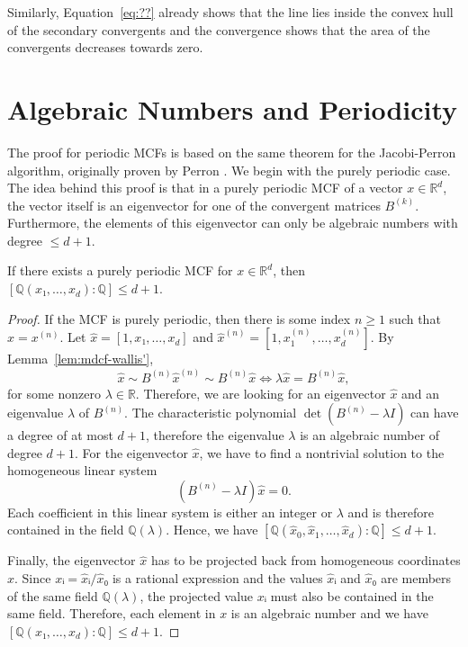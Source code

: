Similarly,
Equation~\ref{eq:??} already shows that the line lies inside the convex hull of
the secondary convergents
and the convergence shows that the area of the convergents decreases towards zero.
\fi

\section{Algebraic Numbers and Periodicity}
\label{sec:mcf-periodic}

The proof for periodic MCFs is based on the same theorem for the Jacobi-Perron
algorithm, originally proven by Perron \cite{Perron07}.
We begin with the purely periodic case.
The idea behind this proof is that in a purely periodic MCF of a vector $x ∈ ℝ^d$,
the vector itself is an eigenvector for one of the convergent matrices $B^{(k)}$.
Furthermore, the elements of this eigenvector can only be algebraic numbers with degree $≤ d+1$.

\begin{lemma}
  \label{lem:mdcf-purely-periodic}
  If there exists a purely periodic MCF for $x ∈ ℝ^d$,
  then $[ℚ(x₁, …, x_d) : ℚ] ≤ d+1$.
\end{lemma}

\begin{proof}
  If the MCF is purely periodic, then there is some index $n ≥ 1$ such that $x = x^{(n)}$.
  Let $\hat x = [1, x₁, …, x_d]$ and $\hat x^{(n)} = [1, x_1^{(n)}, …, x_d^{(n)}]$.
  By Lemma~\ref{lem:mdcf-wallis'},
  \[
    \hat x \sim B^{(n)} \hat x^{(n)} \sim B^{(n)} \hat x \iff λ \hat x = B^{(n)} \hat x,
  \]
  for some nonzero $λ ∈ ℝ$.
  Therefore, we are looking for an eigenvector $\hat x$ and an eigenvalue $λ$ of $B^{(n)}$.
  The characteristic polynomial $\det(B^{(n)} - λ I)$ can have a degree of at most $d+1$,
  therefore the eigenvalue $λ$ is an algebraic number of degree $d+1$.
  For the eigenvector $\hat x$, we have to find a nontrivial solution to the
  homogeneous linear system
  \[
    (B^{(n)} - λ I) \hat x = 0.
  \]
  Each coefficient in this linear system is either an integer or $λ$ and is
  therefore contained in the field $ℚ(λ)$.
  Hence, we have $[ℚ(\hat x_0, \hat x_1, …, \hat x_d) : ℚ] ≤ d+1$.

  Finally, the eigenvector $\hat x$ has to be projected back from homogeneous coordinates $x$.
  Since $xᵢ = \hat xᵢ / \hat x₀$ is a rational expression and the values $\hat xᵢ$ and $\hat x₀$ are members of the same field $ℚ(λ)$,
  the projected value $xᵢ$ must also be contained in the same field.
  Therefore, each element in $x$ is an algebraic number
  and we have $[ℚ(x₁, …, x_d) : ℚ] ≤ d+1$.
\end{proof}


